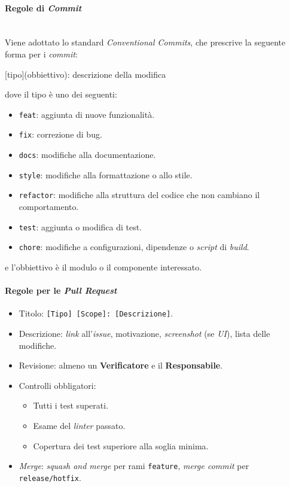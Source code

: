 \documentclass[12pt, a4paper]{article}
\begin{document}
\paragraph{Regole di \textit{Commit}}~\\
Viene adottato lo standard \textit{Conventional Commits}, che prescrive la seguente forma per i \textit{commit}:
\begin{center}
    [tipo](obbiettivo): descrizione della modifica
\end{center}
dove il tipo è uno dei seguenti:
\begin{itemize}
    \item \texttt{feat}: aggiunta di nuove funzionalità.
    \item \texttt{fix}: correzione di bug.
    \item \texttt{docs}: modifiche alla documentazione.
    \item \texttt{style}: modifiche alla formattazione o allo stile.
    \item \texttt{refactor}: modifiche alla struttura del codice che non cambiano il comportamento.
    \item \texttt{test}: aggiunta o modifica di test.
    \item \texttt{chore}: modifiche a configurazioni, dipendenze o \textit{script} di \textit{build}.
\end{itemize}
e l'obbiettivo è il modulo o il componente interessato.

\paragraph{Regole per le \textit{Pull Request}}
\begin{itemize}
    \item Titolo: \texttt{[Tipo] [Scope]: [Descrizione]}.
    \item Descrizione: \textit{link} all'\textit{issue}, motivazione, \textit{screenshot} (se \textit{UI}), lista delle modifiche.
    \item Revisione: almeno un \textbf{Verificatore} e il \textbf{Responsabile}.
    \item Controlli obbligatori:
    \begin{itemize}
        \item Tutti i test superati.
        \item Esame del \textit{linter} passato.
        \item Copertura dei test superiore alla soglia minima.
    \end{itemize}
    \item \textit{Merge}: \textit{squash and merge} per rami \texttt{feature}, \textit{merge commit} per \texttt{release/hotfix}.
\end{itemize}
\end{document}
